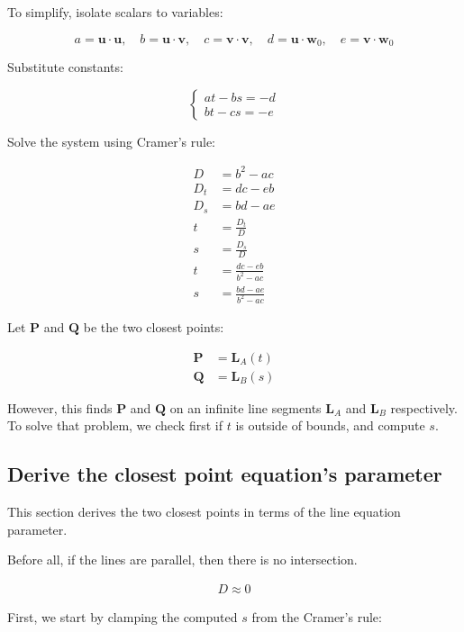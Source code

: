 \documentclass{article}
\begin{document}
To simplify, isolate scalars to variables:

\[
a = \mathbf{u} \cdot \mathbf{u}, \quad
b = \mathbf{u} \cdot \mathbf{v}, \quad
c = \mathbf{v} \cdot \mathbf{v}, \quad
d = \mathbf{u} \cdot \mathbf{w}_0, \quad
e = \mathbf{v} \cdot \mathbf{w}_0
\]

Substitute constants:

\[
\begin{cases}
    at - bs = -d \\
    bt - cs = -e
\end{cases}
\]

Solve the system using Cramer's rule:

\begin{align*}
    D &= b^2 - ac \\
    D_t &= dc - eb \\
    D_s &= bd - ae \\
    t &= \frac{D_t}{D} \\
    s &= \frac{D_s}{D} \\
    t &= \frac{dc - eb}{b^2 - ac} \\
    s &= \frac{bd - ae}{b^2 - ac}
\end{align*}

Let $\mathbf{P}$ and $\mathbf{Q}$ be the two closest points:

\begin{align*}
    \mathbf{P} &= \mathbf{L}_A(t) \\
    \mathbf{Q} &= \mathbf{L}_B(s)
\end{align*}

However, this finds $\mathbf{P}$ and $\mathbf{Q}$ on an infinite line segments $\mathbf{L}_A$ and $\mathbf{L}_B$ respectively. To solve that problem, we check first if $t$ is outside of bounds, and compute $s$.

\subsection*{Derive the closest point equation's parameter}

This section derives the two closest points in terms of the line equation parameter.

Before all, if the lines are parallel, then there is no intersection.

\begin{align*}
    D \approx 0
\end{align*}

First, we start by clamping the computed $s$ from the Cramer's rule:
\end{document}
